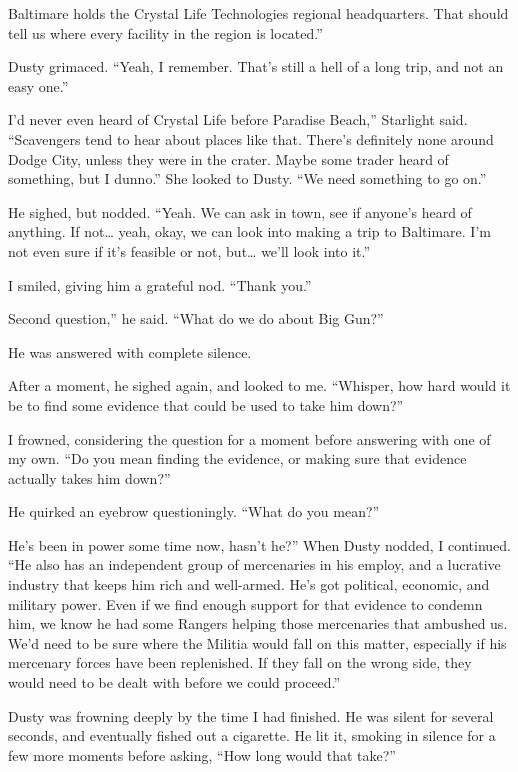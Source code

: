 \leavevmode{}Baltimare holds the Crystal Life Technologies regional headquarters. That should tell us where every facility in the region is located.”

Dusty grimaced. “Yeah, I remember. That’s still a hell of a long trip, and not an easy one.”

\leavevmode{}I’d never even heard of Crystal Life before Paradise Beach,” Starlight said. “Scavengers tend to hear about places like that. There’s definitely none around Dodge City, unless they were in the crater. Maybe some trader heard of something, but I dunno.” She looked to Dusty. “We need something to go on.”

He sighed, but nodded. “Yeah. We can ask in town, see if anyone’s heard of anything. If not… yeah, okay, we can look into making a trip to Baltimare. I’m not even sure if it’s feasible or not, but… we’ll look into it.”

I smiled, giving him a grateful nod. “Thank you.”

\leavevmode{}Second question,” he said. “What do we do about Big Gun?”

He was answered with complete silence.

After a moment, he sighed again, and looked to me. “Whisper, how hard would it be to find some evidence that could be used to take him down?”

I frowned, considering the question for a moment before answering with one of my own. “Do you mean finding the evidence, or making sure that evidence actually takes him down?”

He quirked an eyebrow questioningly. “What do you mean?”

\leavevmode{}He’s been in power some time now, hasn’t he?” When Dusty nodded, I continued. “He also has an independent group of mercenaries in his employ, and a lucrative industry that keeps him rich and well-armed. He’s got political, economic, and military power. Even if we find enough support for that evidence to condemn him, we know he had some Rangers helping those mercenaries that ambushed us. We’d need to be sure where the Militia would fall on this matter, especially if his mercenary forces have been replenished. If they fall on the wrong side, they would need to be dealt with before we could proceed.”

Dusty was frowning deeply by the time I had finished. He was silent for several seconds, and eventually fished out a cigarette. He lit it, smoking in silence for a few more moments before asking, “How long would that take?”

